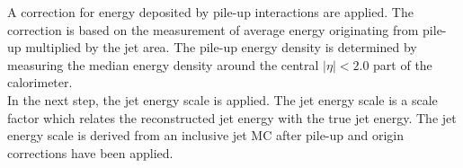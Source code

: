 \indent A correction for energy deposited by pile-up interactions are applied.\cite{pileupsub}  The correction is based on the measurement of average energy originating from pile-up multiplied by the jet area.  The pile-up energy density is determined by measuring the median energy density around the central $|\eta|<2.0$ part of the calorimeter. \\ %





\indent In the next step, the jet energy scale is applied.  The jet energy scale is a scale factor which relates the reconstructed jet energy with the true jet energy.  The jet energy scale is derived from an inclusive jet MC after pile-up and origin corrections have been applied.\cite{JetCalibration13TeV}  \\%

